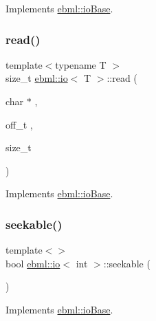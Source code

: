 Implements \mbox{\hyperlink{classebml_1_1ioBase_aba93b64f19016207b3d6c43183a2be07}{ebml\+::io\+Base}}.

\mbox{\label{classebml_1_1io_ad745dc2c29544750dcd38a21cba0a16c}} 
\subsubsection{\texorpdfstring{read()}{read()}\hspace{0.1cm}{\footnotesize\ttfamily [2/2]}}
{\footnotesize\ttfamily template$<$typename T $>$ \\
size\+\_\+t \mbox{\hyperlink{classebml_1_1io}{ebml\+::io}}$<$ T $>$\+::read (\begin{DoxyParamCaption}\item[{char $\ast$}]{,  }\item[{off\+\_\+t}]{,  }\item[{size\+\_\+t}]{ }\end{DoxyParamCaption})\hspace{0.3cm}{\ttfamily [virtual]}}



Implements \mbox{\hyperlink{classebml_1_1ioBase_aba93b64f19016207b3d6c43183a2be07}{ebml\+::io\+Base}}.

\mbox{\label{classebml_1_1io_a6e97c1e6868bf65286328b9447eaa419}} 
\subsubsection{\texorpdfstring{seekable()}{seekable()}\hspace{0.1cm}{\footnotesize\ttfamily [1/3]}}
{\footnotesize\ttfamily template$<$$>$ \\
bool \mbox{\hyperlink{classebml_1_1io}{ebml\+::io}}$<$ int $>$\+::seekable (\begin{DoxyParamCaption}{ }\end{DoxyParamCaption})\hspace{0.3cm}{\ttfamily [virtual]}}



Implements \mbox{\hyperlink{classebml_1_1ioBase_a413541f633f97d68021cbf58837e1970}{ebml\+::io\+Base}}.

\mbox{\label{classebml_1_1io_a4ea6caf18c5646646b3a15bc3c59a5ab}} 
